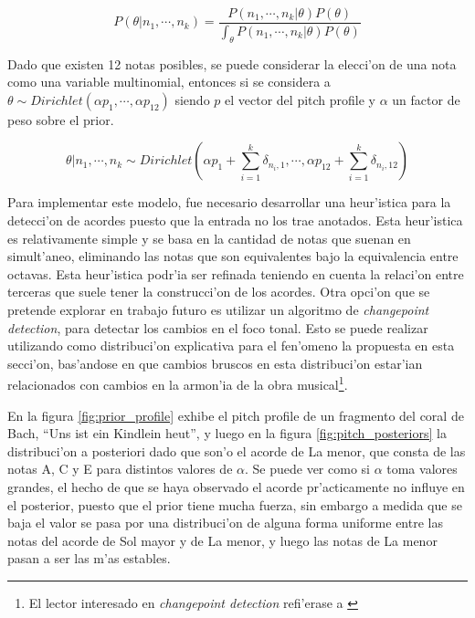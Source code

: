 $$P(\theta|n_1, \cdots, n_k) = \frac{P(n_1,\cdots, n_k | \theta) P(\theta)}{\int_{\theta}P(n_1, \cdots, n_k | \theta) P(\theta)}$$

Dado que existen 12 notas posibles, se puede considerar la elecci'on de una nota como una variable multinomial, entonces 
si se considera a $\theta \sim Dirichlet(\alpha p_1, \cdots, \alpha p_{12})$ siendo $p$ el vector del pitch profile y $\alpha$ un factor de peso sobre el prior.

$$\theta | n_1, \cdots, n_k \sim Dirichlet(\alpha p_1 + \sum_{i=1}^k \delta_{n_i,1}, \cdots, \alpha p_{12} + \sum_{i=1}^k \delta_{n_i,12})$$

Para implementar este modelo, fue necesario desarrollar una heur'istica para la detecci'on de acordes puesto que la entrada no los trae anotados. 
Esta heur'istica es relativamente simple y se basa en la cantidad de notas
que suenan en simult'aneo, eliminando las notas que son equivalentes bajo la equivalencia entre octavas. Esta heur'istica podr'ia ser refinada teniendo en cuenta la relaci'on entre
terceras que suele tener la construcci'on de los acordes. Otra opci'on que se pretende explorar en trabajo futuro es utilizar un algoritmo de \emph{changepoint detection}, para
detectar los cambios en el foco tonal. Esto se puede realizar utilizando como distribuci'on explicativa para el fen'omeno la propuesta en esta secci'on, 
bas'andose en que cambios bruscos en esta distribuci'on estar'ian relacionados con cambios en la armon'ia de la obra musical\footnote{El lector interesado en \emph{changepoint detection} refi'erase a \cite{adams-mackay-2007}}.

En la figura \ref{fig:prior_profile} exhibe el pitch profile de un fragmento del coral de Bach,  ``Uns ist ein Kindlein heut'', y luego en la figura \ref{fig:pitch_posteriors}
la distribuci'on a posteriori dado que son'o el acorde de La menor, que consta de las notas A, C y E para distintos valores de $\alpha$. 
Se puede ver como si $\alpha$ toma valores grandes, el hecho
de que se haya observado el acorde pr'acticamente no influye en el posterior, puesto que el prior tiene mucha fuerza, sin embargo a medida que se baja el valor se pasa por una 
distribuci'on de alguna forma uniforme entre las notas del acorde de Sol mayor y de La menor, y luego las notas de La menor pasan a ser las m'as estables.

\begin{imagen}
    \width{10cm}
\end{imagen}

